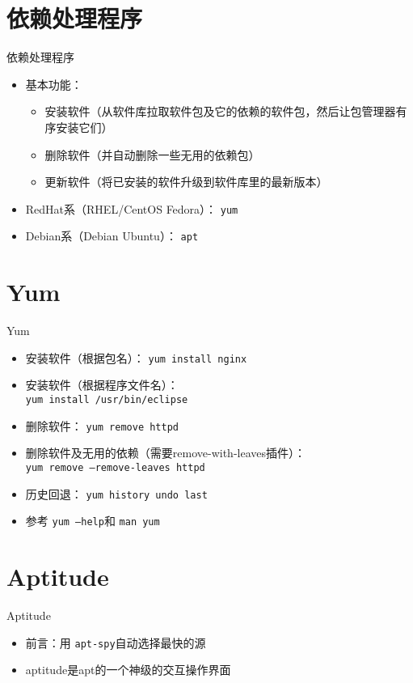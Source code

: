 \documentclass[CJK,xetex]{beamer}
\newcommand{\mycmd}[1]{{\color{blue} \texttt{#1}}}
\newcommand{\myfile}[1]{{\color{purple} \texttt{#1}}}
\begin{document}
\section{依赖处理程序}
\begin{frame}{依赖处理程序}
\begin{itemize}[<+->]
  \item 基本功能：
\begin{itemize}
  \item 安装软件（从软件库拉取软件包及它的依赖的软件包，然后让包管理器有序安装它们）
  \item 删除软件（并自动删除一些无用的依赖包）
  \item 更新软件（将已安装的软件升级到软件库里的最新版本）
\end{itemize}
  \item RedHat系（RHEL/CentOS Fedora）：\myfile{yum}
    \item Debian系（Debian Ubuntu）：\myfile{apt}
\end{itemize}
\end{frame}

\section{Yum}
\begin{frame}{Yum}
  \begin{itemize}
  \item 安装软件（根据包名）：\mycmd{yum install nginx}
  \item 安装软件（根据程序文件名）：\\ \mycmd{yum install /usr/bin/eclipse}
  \item 删除软件：\mycmd{yum remove httpd}
  \item 删除软件及无用的依赖（需要remove-with-leaves插件）：\\ \mycmd{yum remove --remove-leaves httpd}
  \item 历史回退：\mycmd{yum history undo last}
  \item 参考\mycmd{yum --help}和\mycmd{man yum}
  \end{itemize}
\end{frame}

\section{Aptitude}
\begin{frame}{Aptitude}
  \begin{itemize}
    \item 前言：用\myfile{apt-spy}自动选择最快的源
    \item aptitude是apt的一个神级的交互操作界面
  \end{itemize}
\end{frame}
\end{document}
